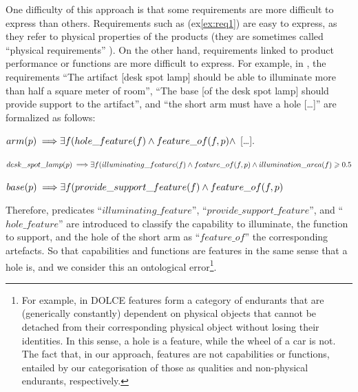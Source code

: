 \documentclass[sw]{iosart2x}
\newcommand{\bflist}{\begin{list}{}{\setlength{\topsep}{2mm}\setlength{\partopsep}{0mm}\setlength{\parsep}{0mm}\setlength{\leftmargin}{9mm}\setlength{\labelwidth}{8mm}}}
\newcommand{\eflist}{\end{list}}
\newcommand{\ExLabel}{\textrm{ex}}
\newcommand{\myex}[1]{\refstepcounter{cntex}\begin{small}{\bf \ExLabel\thecntex\label{ex:#1}}\end{small}}
\newcounter{cntex}
\newcommand{\refex}[1]{({\ExLabel}\ref{#1})}
\newcommand{\myfi}{\hspace{0.9mm} \Longrightarrow}
\newcommand{\DOLCE}{\textsc{DOLCE}\xspace} %
\newcommand{\qquotes}[1]{``#1''}
\begin{document}
One difficulty of this approach is that some requirements are more difficult to express than others.
Requirements such as \refex{ex:req1} are easy to express, as they refer to physical properties of the products (they are sometimes called \qquotes{physical requirements} \cite{jinxinlinRequirementOntologyEngineering1996}).
On the other hand, requirements linked to product performance or functions are more difficult to express.
For example, in \cite{jinxinlinRequirementOntologyEngineering1996}, the requirements \qquotes{The artifact [desk spot lamp] should be able to illuminate more than half a square meter of room}, \qquotes{The base [of the desk spot lamp] should provide support to the artifact}, and \qquotes{the short arm must have a hole [\dots]} are formalized as follows: 
\bflist
  \item[\myex{req2}] $ arm(p) \myfi \exists f(hole\_feature(f) \land
 feature\_of(f, p) \land
  $ [\dots]. 
  \item[\myex{req3}] $ desk\_spot\_lamp(p) \myfi \exists f( illuminating\_feature(f) \land feature\_of(f, p) \land illumination\_area(f) \geq 0.5 $
  \item[\myex{req4}] $ base(p) \myfi \exists f (provide\_support\_feature(f) \land feature\_of(f, p) $ 
\eflist
Therefore, predicates \qquotes{$illuminating\_feature$}, \qquotes{$provide\_support\_feature$}, and \qquotes{$hole\_feature$} are introduced to classify the capability to illuminate, the function to support, and the hole of the short arm as \qquotes{$feature\_of$} the corresponding artefacts. 
So that capabilities and functions are features in the same sense that a hole is, and we consider this an ontological error\footnote{For example, in \DOLCE features form a category of endurants that are (generically constantly) dependent on physical objects that cannot be detached from their corresponding physical object without losing their identities. In this sense, a hole is a feature, while the wheel of a car is not. The fact that, in our approach, features are not capabilities or functions, entailed by our categorisation of those as qualities and non-physical endurants, respectively.}.
\end{document}
